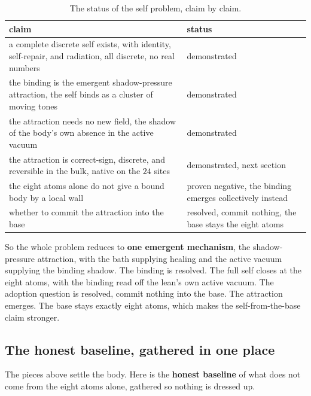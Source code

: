 \begin{table}[ht]
\centering
\begin{tabular}{@{}p{}p{}@{}}
\toprule
claim & status \\
\midrule
a complete discrete self exists, with identity, self-repair, and radiation, all discrete, no real numbers & demonstrated \\
the binding is the emergent shadow-pressure attraction, the self binds as a cluster of moving tones & demonstrated \\
the attraction needs no new field, the shadow of the body's own absence in the active vacuum & demonstrated \\
the attraction is correct-sign, discrete, and reversible in the bulk, native on the $24$ sites & demonstrated, next section \\
the eight atoms alone do not give a bound body by a local wall & proven negative, the binding emerges collectively instead \\
whether to commit the attraction into the base & resolved, commit nothing, the base stays the eight atoms \\
\bottomrule
\end{tabular}
\caption{The status of the self problem, claim by claim.}
\label{tab:status}
\end{table}

So the whole problem reduces to \textbf{one emergent mechanism}, the shadow-pressure attraction, with the bath supplying healing and the active vacuum supplying the binding shadow. The binding is resolved. The full self closes at the eight atoms, with the binding read off the lean's own active vacuum. The adoption question is resolved, commit nothing into the base. The attraction emerges. The base stays exactly eight atoms, which makes the self-from-the-base claim stronger.

\subsection{The honest baseline, gathered in one place}

The pieces above settle the body. Here is the \textbf{honest baseline} of what does not come from the eight atoms alone, gathered so nothing is dressed up.

